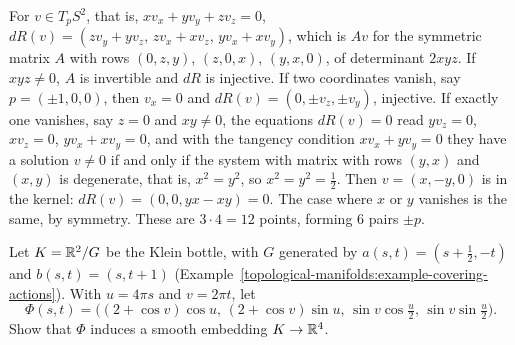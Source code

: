 \begin{solution}
For $v \in T_pS^2$, that is, $xv_x + yv_y + zv_z = 0$, $dR(v) = (zv_y + yv_z, \, zv_x + xv_z, \, yv_x + xv_y)$, which is $Av$ for the symmetric matrix $A$ with rows $(0, z, y)$, $(z, 0, x)$, $(y, x, 0)$, of determinant $2xyz$.
If $xyz \neq 0$, $A$ is invertible and $dR$ is injective. If two coordinates vanish, say $p = (\pm1, 0, 0)$, then $v_x = 0$ and $dR(v) = (0, \pm v_z, \pm v_y)$, injective. If exactly one vanishes, say $z = 0$ and $xy \neq 0$, the
equations $dR(v) = 0$ read $yv_z = 0$, $xv_z = 0$, $yv_x + xv_y = 0$, and with the tangency condition $xv_x + yv_y = 0$ they have a solution $v \neq 0$ if and only if the system with matrix with rows $(y, x)$ and $(x, y)$ is
degenerate, that is, $x^2 = y^2$, so $x^2 = y^2 = \frac12$. Then $v = (x, -y, 0)$ is in the kernel: $dR(v) = (0, 0, yx - xy) = 0$. The case where $x$ or $y$ vanishes is the same, by symmetry. These are $3 \cdot 4 = 12$ points,
forming $6$ pairs $\pm p$.
\end{solution}

\begin{exercise}\label{smooth-manifolds:exercise-klein-r4}
Let $K = \mathbb{R}^2/G$ be the Klein bottle, with $G$ generated by $a(s, t) = (s + \frac12, -t)$ and $b(s, t) = (s, t + 1)$ (Example~\ref{topological-manifolds:example-covering-actions}). With $u = 4\pi s$ and $v = 2\pi t$, let
\[
\Phi(s, t) = \bigl((2 + \cos v)\cos u, \, (2 + \cos v)\sin u, \, \sin v\cos\tfrac u2, \, \sin v\sin\tfrac u2\bigr).
\]
Show that $\Phi$ induces a smooth embedding $K \to \mathbb{R}^4$.
\end{exercise}


